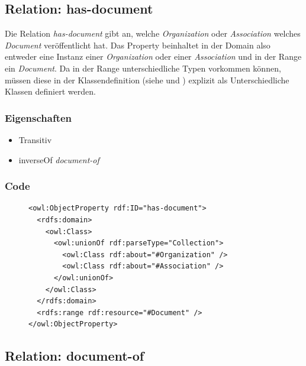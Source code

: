 \documentclass[
    11pt,
    latin1,
    a4paper,
    oneside
]{scrreprt}
\begin{document}
\subsection{Relation: has-document} \label{sec:rel_hasdocument}

Die Relation \emph{has-document} gibt an, welche \emph{Organization} oder \emph{Association} welches \emph{Document} ver\"offentlicht hat. Das Property beinhaltet in der Domain also entweder eine Instanz einer \emph{Organization} oder einer \emph{Association} und in der Range ein \emph{Document}. Da in der Range unterschiedliche Typen vorkommen k\"onnen, m\"ussen diese in der Klassendefinition (siehe  und ) explizit als Unterschiedliche Klassen definiert werden.

\subsubsection{Eigenschaften} \label{sec:rel_hasdocument_settings}

\begin{itemize}
  \item Transitiv
  \item inverseOf \emph{document-of}
\end{itemize}

\subsubsection{Code} \label{sec:rel_hasdocument_code}

\begin{figure}[H]
 \lstset{language=XML}
 \begin{lstlisting}[label=owl:hasdocument,caption={Die Relation \emph{has-document} verkn\"upft eine \emph{Organization} mit einem \emph{Document}}]
<owl:ObjectProperty rdf:ID="has-document">
  <rdfs:domain>
    <owl:Class>
      <owl:unionOf rdf:parseType="Collection">
        <owl:Class rdf:about="#Organization" />
        <owl:Class rdf:about="#Association" />
      </owl:unionOf>
    </owl:Class>
  </rdfs:domain>
  <rdfs:range rdf:resource="#Document" />
</owl:ObjectProperty>
 \end{lstlisting}
\end{figure}


\subsection{Relation: document-of} \label{sec:rel_documentof}
\end{document}

